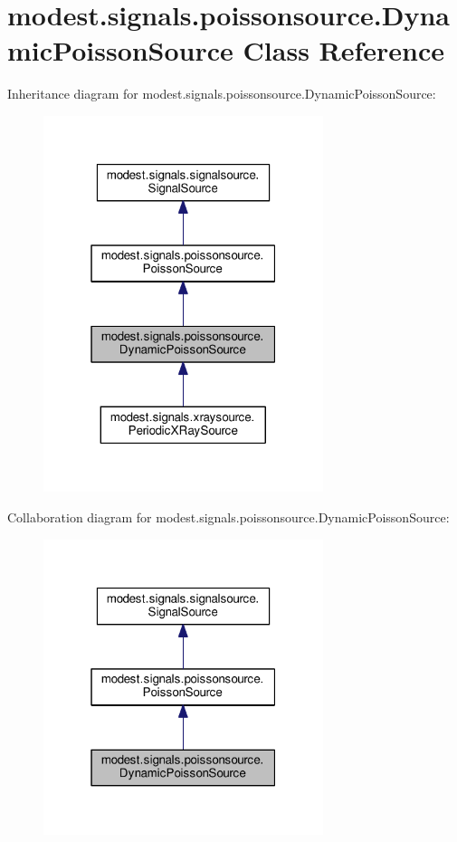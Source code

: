 \hypertarget{classmodest_1_1signals_1_1poissonsource_1_1DynamicPoissonSource}{}\section{modest.\+signals.\+poissonsource.\+Dynamic\+Poisson\+Source Class Reference}
\label{classmodest_1_1signals_1_1poissonsource_1_1DynamicPoissonSource}


Inheritance diagram for modest.\+signals.\+poissonsource.\+Dynamic\+Poisson\+Source\+:
\nopagebreak
\begin{figure}[H]
\begin{center}
\leavevmode
\includegraphics[width=232pt]{classmodest_1_1signals_1_1poissonsource_1_1DynamicPoissonSource__inherit__graph}
\end{center}
\end{figure}


Collaboration diagram for modest.\+signals.\+poissonsource.\+Dynamic\+Poisson\+Source\+:
\nopagebreak
\begin{figure}[H]
\begin{center}
\leavevmode
\includegraphics[width=232pt]{classmodest_1_1signals_1_1poissonsource_1_1DynamicPoissonSource__coll__graph}
\end{center}
\end{figure}
